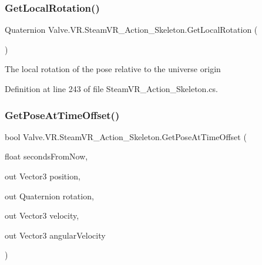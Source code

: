 \mbox{\label{class_valve_1_1_v_r_1_1_steam_v_r___action___skeleton_a441c342e8cb29b52c7390279832bfdfa}} 
\subsubsection{\texorpdfstring{GetLocalRotation()}{GetLocalRotation()}}
{\footnotesize\ttfamily Quaternion Valve.\+V\+R.\+Steam\+V\+R\+\_\+\+Action\+\_\+\+Skeleton.\+Get\+Local\+Rotation (\begin{DoxyParamCaption}{ }\end{DoxyParamCaption})}



The local rotation of the pose relative to the universe origin 



Definition at line 243 of file Steam\+V\+R\+\_\+\+Action\+\_\+\+Skeleton.\+cs.

\mbox{\label{class_valve_1_1_v_r_1_1_steam_v_r___action___skeleton_a7b58460cbccf9e520d1463a20a7aaf67}} 
\subsubsection{\texorpdfstring{GetPoseAtTimeOffset()}{GetPoseAtTimeOffset()}}
{\footnotesize\ttfamily bool Valve.\+V\+R.\+Steam\+V\+R\+\_\+\+Action\+\_\+\+Skeleton.\+Get\+Pose\+At\+Time\+Offset (\begin{DoxyParamCaption}\item[{float}]{seconds\+From\+Now,  }\item[{out Vector3}]{position,  }\item[{out Quaternion}]{rotation,  }\item[{out Vector3}]{velocity,  }\item[{out Vector3}]{angular\+Velocity }\end{DoxyParamCaption})}



